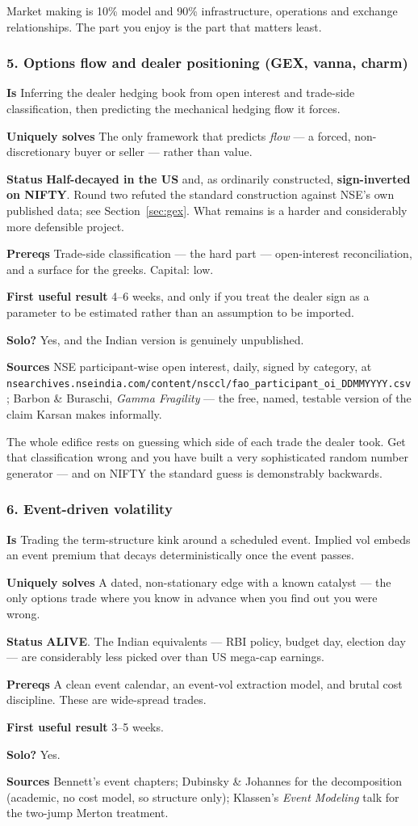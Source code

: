 \documentclass[11pt,a4paper]{article}
\newcommand{\alv}[1]{\textcolor{alive}{\textbf{#1}}}
\newcommand{\dec}[1]{\textcolor{decayed}{\textbf{#1}}}
\newcommand{\fitem}[1]{\par\smallskip\noindent\textbf{#1} }
\begin{document}
\begin{waste}
Market making is 10\% model and 90\% infrastructure, operations and exchange
relationships. The part you enjoy is the part that matters least.
\end{waste}

\subsubsection{5. Options flow and dealer positioning (GEX, vanna, charm)}
\fitem{Is}Inferring the dealer hedging book from open interest and trade-side
classification, then predicting the mechanical hedging flow it forces.
\fitem{Uniquely solves}The only framework that predicts \emph{flow} --- a
forced, non-discretionary buyer or seller --- rather than value.
\fitem{Status}\dec{Half-decayed in the US} and, as ordinarily constructed,
\dec{sign-inverted on NIFTY}. Round two refuted the standard construction against
NSE's own published data; see Section~\ref{sec:gex}. What remains is a harder and
considerably more defensible project.
\fitem{Prereqs}Trade-side classification --- the hard part --- open-interest
reconciliation, and a surface for the greeks. Capital: low.
\fitem{First useful result}4--6 weeks, and only if you treat the dealer sign as a
parameter to be estimated rather than an assumption to be imported.
\fitem{Solo?}Yes, and the Indian version is genuinely unpublished.
\fitem{Sources}NSE participant-wise open interest, daily, signed by category, at
\texttt{nsearchives.nseindia.com/content/nsccl/fao\_participant\_oi\_DDMMYYYY.csv};
Barbon \& Buraschi, \emph{Gamma Fragility} --- the free, named, testable version
of the claim Karsan makes informally.

\begin{waste}
The whole edifice rests on guessing which side of each trade the dealer took.
Get that classification wrong and you have built a very sophisticated random
number generator --- and on NIFTY the standard guess is demonstrably backwards.
\end{waste}

\subsubsection{6. Event-driven volatility}
\fitem{Is}Trading the term-structure kink around a scheduled event. Implied vol
embeds an event premium that decays deterministically once the event passes.
\fitem{Uniquely solves}A dated, non-stationary edge with a known catalyst --- the
only options trade where you know in advance when you find out you were wrong.
\fitem{Status}\alv{ALIVE}. The Indian equivalents --- RBI policy, budget day,
election day --- are considerably less picked over than US mega-cap earnings.
\fitem{Prereqs}A clean event calendar, an event-vol extraction model, and brutal
cost discipline. These are wide-spread trades.
\fitem{First useful result}3--5 weeks.
\fitem{Solo?}Yes.
\fitem{Sources}Bennett's event chapters; Dubinsky \& Johannes for the
decomposition (academic, no cost model, so structure only); Klassen's
\emph{Event Modeling} talk for the two-jump Merton treatment.
\end{document}
